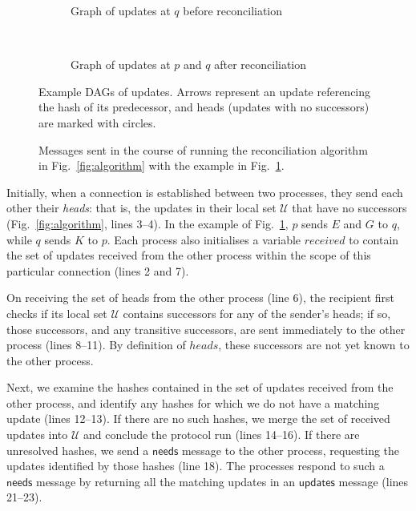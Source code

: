 \documentclass[manuscript,anonymous]{acmart}
\begin{document}
\begin{figure}[p]
\begin{minipage}{0.4\linewidth}
\begin{subfigure}{\textwidth}
    
    \caption{Graph of updates at $q$ before reconciliation}
    \end{subfigure}\\[35pt]
    \begin{subfigure}{\textwidth}
    
    \caption{Graph of updates at $p$ and $q$ after reconciliation}
    \end{subfigure}
    \caption{Example DAGs of updates. Arrows represent an update referencing the hash of its predecessor, and heads (updates with no successors) are marked with circles.}
    \label{fig:example-dags}
\end{minipage}
\end{figure}

\begin{figure}[p]
    \centering
    
    \caption{Messages sent in the course of running the reconciliation algorithm in Fig.~\ref{fig:algorithm} with the example in Fig.~\ref{fig:example-dags}.}
    \label{fig:messages}
\end{figure}

Initially, when a connection is established between two processes, they send each other their \emph{heads}: that is, the updates in their local set $\mathcal{U}$ that have no successors (Fig.~\ref{fig:algorithm}, lines 3--4).
In the example of Fig.~\ref{fig:example-dags}, $p$ sends $E$ and $G$ to $q$, while $q$ sends $K$ to $p$.
Each process also initialises a variable $\mathit{received}$ to contain the set of updates received from the other process within the scope of this particular connection (lines 2 and 7).

On receiving the set of heads from the other process (line 6), the recipient first checks if its local set $\mathcal{U}$ contains successors for any of the sender's heads; if so, those successors, and any transitive successors, are sent immediately to the other process (lines 8--11).
By definition of $\mathit{heads}$, these successors are not yet known to the other process.

Next, we examine the hashes contained in the set of updates received from the other process, and identify any hashes for which we do not have a matching update (lines 12--13).
If there are no such hashes, we merge the set of received updates into $\mathcal{U}$ and conclude the protocol run (lines 14--16).
If there are unresolved hashes, we send a $\mathsf{needs}$ message to the other process, requesting the updates identified by those hashes (line 18).
The processes respond to such a $\mathsf{needs}$ message by returning all the matching updates in an $\mathsf{updates}$ message (lines 21--23).
\end{document}

